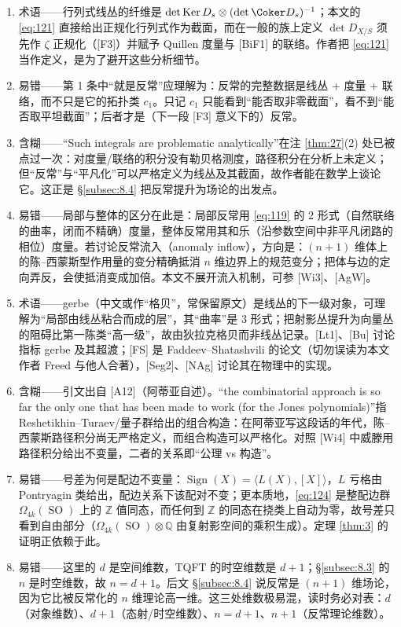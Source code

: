 \documentclass[11pt]{amsart}
\theoremstyle{definition}
\theoremstyle{remark}
\theoremstyle{plain}
\numberwithin{equation}{section}
\renewcommand{\:}{\colon}
\DeclareMathOperator{\Ker}{Ker}
\newcommand{\QQ}{{\mathbb Q}}
\newcommand{\ZZ}{{\mathbb Z}}
\DeclareMathOperator{\SO}{SO}
\DeclareMathOperator{\Sign}{Sign}
\begin{document}
\begin{enumerate}[leftmargin=2.2em,itemsep=2pt,topsep=2pt]
  \item 术语——行列式线丛的纤维是 $\det\Ker D_s\otimes(\det\Coker D_s)^{-1}$；本文的 \eqref{eq:121} 直接给出正规化行列式作为截面，而在一般的族上定义 $\det D_{X/S}$ 须先作 $\zeta$ 正规化（[F3]）并赋予 Quillen 度量与 [BiF1] 的联络。作者把 \eqref{eq:121} 当作定义，是为了避开这些分析细节。
  \item 易错——第 1 条中“就是反常”应理解为：反常的完整数据是线丛 + 度量 + 联络，而不只是它的拓扑类 $c_1$。只记 $c_1$ 只能看到“能否取非零截面”，看不到“能否取平坦截面”；后者才是（下一段 [F3] 意义下的）反常。
  \item 含糊——“Such integrals are problematic analytically”在注 \ref{thm:27}(2) 处已被点过一次：对度量/联络的积分没有勒贝格测度，路径积分在分析上未定义；但“反常”与“平凡化”可以严格定义为线丛及其截面，故作者能在数学上谈论它。这正是 §\ref{subsec:8.4} 把反常提升为场论的出发点。
  \item 易错——局部与整体的区分在此是：局部反常用 \eqref{eq:119} 的 $2$ 形式（自然联络的曲率，闭而不精确）度量，整体反常用其和乐（沿参数空间中非平凡闭路的相位）度量。若讨论反常流入（anomaly inflow），方向是：$(n+1)$ 维体上的陈–西蒙斯型作用量的变分精确抵消 $n$ 维边界上的规范变分；把体与边的定向弄反，会使抵消变成加倍。本文不展开流入机制，可参 [Wi3]、[AgW]。
  \item 术语——gerbe（中文或作“格贝”，常保留原文）是线丛的下一级对象，可理解为“局部由线丛粘合而成的层”，其“曲率”是 $3$ 形式；把射影丛提升为向量丛的阻碍比第一陈类“高一级”，故由狄拉克格贝而非线丛记录。[Lt1]、[Bu] 讨论指标 gerbe 及其超渡；[FS] 是 Faddeev–Shatashvili 的论文（切勿误读为本文作者 Freed 与他人合著），[Seg2]、[NAg] 讨论其在物理中的实现。
  \item 含糊——引文出自 [A12]（阿蒂亚自述）。“the combinatorial approach is so far the only one that has been made to work (for the Jones polynomials)”指 Reshetikhin–Turaev/量子群给出的组合构造：在阿蒂亚写这段话的年代，陈–西蒙斯路径积分尚无严格定义，而组合构造可以严格化。对照 [Wi4] 中威滕用路径积分给出不变量，二者的关系即“公理 vs 构造”。
  \item 易错——号差为何是配边不变量：$\Sign(X)=\langle L(X),[X]\rangle$，$L$ 亏格由 Pontryagin 类给出，配边关系下该配对不变；更本质地，\eqref{eq:124} 是整配边群 $\Omega _{4k}(\SO)$ 上的 $\ZZ$ 值同态，而任何到 $\ZZ$ 的同态在挠类上自动为零，故号差只看到自由部分（$\Omega _{4k}(\SO)\otimes\QQ$ 由复射影空间的乘积生成）。定理 \ref{thm:3} 的证明正依赖于此。
  \item 易错——这里的 $d$ 是空间维数，TQFT 的时空维数是 $d+1$；§\ref{subsec:8.3} 的 $n$ 是时空维数，故 $n=d+1$。后文 §\ref{subsec:8.4} 说反常是 $(n+1)$ 维场论，因为它比被反常化的 $n$ 维理论高一维。这三处维数极易混，读时务必对表：$d$（对象维数）、$d+1$（态射/时空维数）、$n=d+1$、$n+1$（反常理论维数）。

\end{enumerate}
\end{document}
